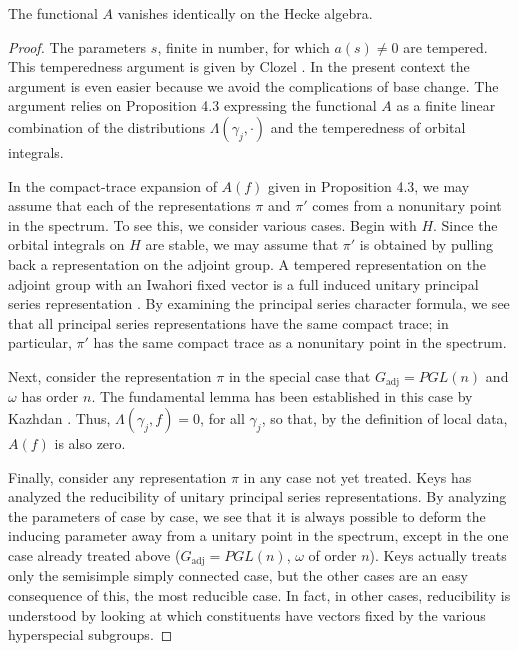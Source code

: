 \documentclass{amsart}
\newenvironment{cthm}[1]
  {\renewcommand\thethm{\sc #1}\thm}
  {\endthm}
\newcommand\adj{{\text{adj}}}
\begin{document}
\begin{cthm}{Lemma 4.4}  The functional $A$ vanishes identically
on the Hecke algebra.
\end{cthm}

\begin{proof} The parameters $s$,
finite in number, for which $a(s)\ne 0$
are tempered.  This temperedness argument is given by Clozel \cite{Cl2,5.5}.  In the
present context the argument is even easier because we avoid the complications
of base change.  The argument relies on Proposition 4.3 expressing the functional
$A$ as a finite linear combination of the distributions $\Lambda(\gamma_j,\cdot)$ and the temperedness of orbital integrals.

In the compact-trace expansion of $A(f)$ given in Proposition 4.3,
we may assume that each of the representations $\pi$ and
$\pi'$ comes from a nonunitary point in the spectrum.  To see this,
we consider various cases.
Begin with $H$. Since the orbital integrals on $H$ are stable,
we may assume that $\pi'$ 
is obtained by pulling back a representation on the adjoint group.
A tempered representation on the adjoint group with an Iwahori fixed
vector is a full induced unitary principal series representation \cite{Ke}.
By examining the principal series character formula, we see that all 
principal series representations have the same compact trace; in
particular, $\pi'$ has the same compact trace as a nonunitary point in the
spectrum.

Next, consider the representation $\pi$ in the special case that $G_\adj=PGL(n)$
and $\omega$ has order $n$.  
The fundamental lemma has been established in this
case by Kazhdan \cite{Ka}. Thus, $\Lambda(\gamma_j,f)=0$, for all $\gamma_j$,
so that, by the definition of local data, $A(f)$ is also zero.

Finally,  consider any representation $\pi$ 
in any case not yet treated.
Keys has analyzed the reducibility of unitary principal series representations.
By analyzing the parameters of \cite{Ke} case by case, we see that it
is always possible to deform the inducing parameter away from a unitary point
in the spectrum, except in the one case already treated above ($G_\adj=PGL(n)$, $\omega$
of order $n$).  Keys actually treats only the semisimple simply connected case,
but the other cases are an easy consequence of this, the most reducible case.
In fact, in other cases, reducibility is understood by looking at which
constituents have vectors fixed by the various hyperspecial subgroups.


\end{proof}
\end{document}
